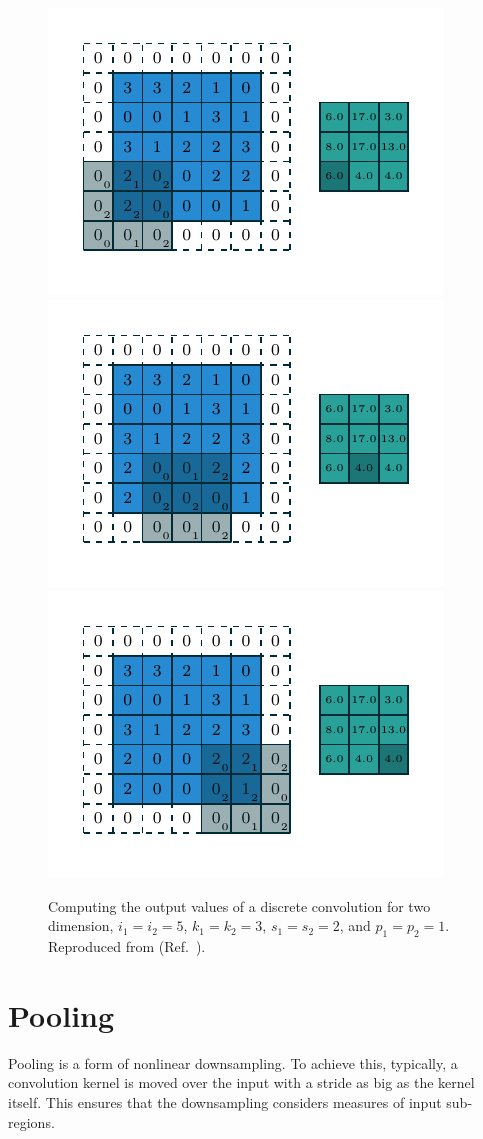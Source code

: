 \begin{figure}
    \includegraphics[width=0.32\linewidth]{ANN/images/numerical_padding_strides_06.pdf}
    \includegraphics[width=0.32\linewidth]{ANN/images/numerical_padding_strides_07.pdf}
    \includegraphics[width=0.32\linewidth]{ANN/images/numerical_padding_strides_08.pdf}
    \caption{Computing the output values
        of a discrete convolution for two dimension, $i_1 = i_2 = 5$, $k_1 = k_2 = 3$,
        $s_1 = s_2 = 2$, and $p_1 = p_2 = 1$.
        Reproduced from  (Ref.~\cite{Dumoulin2016}).
    }
    \label{fig:numerical_padding_strides}
\end{figure}


\section{Pooling}\label{sec:pooling}
Pooling is a form of nonlinear downsampling.
To achieve this, typically, a convolution kernel is moved over the input with a stride as big as the kernel itself.
This ensures that the downsampling considers measures of input sub-regions.


